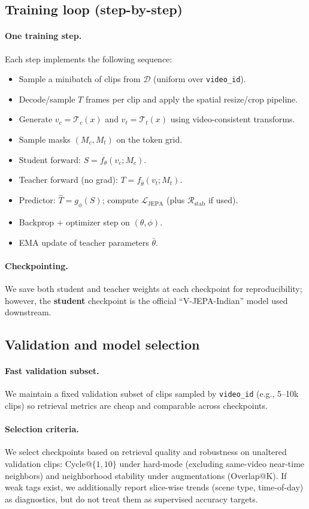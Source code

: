 \subsection{Training loop (step-by-step)}\label{sec:ctp_loop}
\paragraph{One training step.} Each step implements the following sequence:
\begin{itemize}
  \item Sample a minibatch of clips from $\mathcal{D}$ (uniform over \texttt{video\_id}).
  \item Decode/sample $T$ frames per clip and apply the spatial resize/crop pipeline.
  \item Generate $v_c=\mathcal{T}_c(x)$ and $v_t=\mathcal{T}_t(x)$ using video-consistent transforms.
  \item Sample masks $(M_c,M_t)$ on the token grid.
  \item Student forward: $S=f_\theta(v_c;M_c)$.
  \item Teacher forward (no grad): $T=f_{\bar{\theta}}(v_t;M_t)$.
  \item Predictor: $\hat{T}=g_\phi(S)$; compute $\mathcal{L}_{\mathrm{JEPA}}$ (plus $\mathcal{R}_{\mathrm{stab}}$ if used).
  \item Backprop + optimizer step on $(\theta,\phi)$.
  \item EMA update of teacher parameters $\bar{\theta}$.
\end{itemize}
\paragraph{Checkpointing.} We save both student and teacher weights at each checkpoint for reproducibility; however, the \textbf{student} checkpoint is the official ``V-JEPA-Indian'' model used downstream.

\subsection{Validation and model selection}\label{sec:ctp_eval}
\paragraph{Fast validation subset.} We maintain a fixed validation subset of clips sampled by \texttt{video\_id} (e.g., 5--10k clips) so retrieval metrics are cheap and comparable across checkpoints.
\paragraph{Selection criteria.} We select checkpoints based on retrieval quality and robustness on unaltered validation clips:
Cycle@$\{1,10\}$ under hard-mode (excluding same-video near-time neighbors) and neighborhood stability under augmentations (Overlap@K). If weak tags exist, we additionally report slice-wise trends (scene type, time-of-day) as diagnostics, but do not treat them as supervised accuracy targets.

